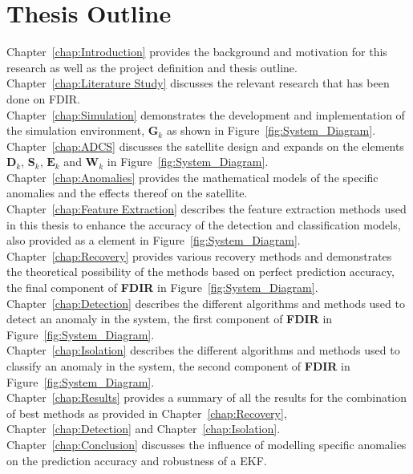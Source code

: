 \section{Thesis Outline}
Chapter~\ref{chap:Introduction} provides the background and motivation for this research as well as the project definition and thesis outline.
\\
Chapter~\ref{chap:Literature Study} discusses the relevant research that has been done on FDIR.
\\
Chapter~\ref{chap:Simulation} demonstrates the development and implementation of the simulation environment, $\mathbf{G}_k$ as shown in Figure~\ref{fig:System_Diagram}.
\\
Chapter~\ref{chap:ADCS} discusses the satellite design and expands on the elements $\mathbf{D}_k$, $\mathbf{S}_k$, $\mathbf{E}_k$ and $\mathbf{W}_k$ in Figure~\ref{fig:System_Diagram}.
\\
Chapter~\ref{chap:Anomalies} provides the mathematical models of the specific anomalies and the effects thereof on the satellite.
\\
Chapter~\ref{chap:Feature Extraction} describes the feature extraction methods used in this thesis to enhance the accuracy of the detection and classification models, also provided as a element in Figure~\ref{fig:System_Diagram}.
\\
Chapter~\ref{chap:Recovery} provides various recovery methods and demonstrates the theoretical possibility of the methods based on perfect prediction accuracy, the final component of \textbf{FDIR} in Figure~\ref{fig:System_Diagram}.
\\
Chapter~\ref{chap:Detection} describes the different algorithms and methods used to detect an anomaly in the system, the first component of \textbf{FDIR} in Figure~\ref{fig:System_Diagram}.
\\
Chapter~\ref{chap:Isolation} describes the different algorithms and methods used to classify an anomaly in the system, the second component of \textbf{FDIR} in Figure~\ref{fig:System_Diagram}.
\\
Chapter~\ref{chap:Results} provides a summary of all the results for the combination of best methods as provided in Chapter~\ref{chap:Recovery}, Chapter~\ref{chap:Detection} and Chapter~\ref{chap:Isolation}.
\\
Chapter~\ref{chap:Conclusion} discusses the influence of modelling specific anomalies on the prediction accuracy and robustness of a EKF.